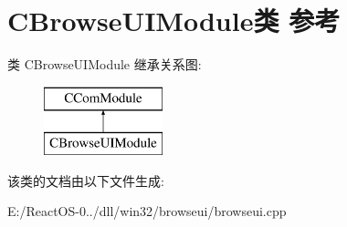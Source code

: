 \hypertarget{class_c_browse_u_i_module}{}\section{C\+Browse\+U\+I\+Module类 参考}
\label{class_c_browse_u_i_module}
类 C\+Browse\+U\+I\+Module 继承关系图\+:\begin{figure}[H]
\begin{center}
\leavevmode
\includegraphics[height=2.000000cm]{class_c_browse_u_i_module}
\end{center}
\end{figure}


该类的文档由以下文件生成\+:\begin{DoxyCompactItemize}
\item 
E\+:/\+React\+O\+S-\/0../dll/win32/browseui/browseui.\+cpp\end{DoxyCompactItemize}
